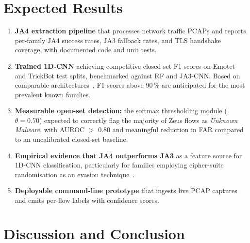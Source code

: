 \documentclass[12pt,a4paper]{report}
\begin{document}
\chapter{Expected Results}

\begin{enumerate}[leftmargin=*, label=\arabic*.]
  \item \textbf{JA4 extraction pipeline} that processes network traffic PCAPs and
  reports per-family JA4 success rates, JA3 fallback rates, and TLS handshake
  coverage, with documented code and unit tests.

  \item \textbf{Trained 1D-CNN} achieving competitive closed-set F1-scores on
  Emotet and TrickBot test splits, benchmarked against RF and JA3-CNN. Based on
  comparable architectures~\cite{liu2024encrypted, spd2025}, F1-scores above
  90\,\% are anticipated for the most prevalent known families.

  \item \textbf{Measurable open-set detection:} the softmax thresholding module
  ($\theta = 0.70$) expected to correctly flag the majority of Zeus flows as
  \textit{Unknown Malware}, with AUROC $>$ 0.80 and meaningful reduction in FAR
  compared to an uncalibrated closed-set baseline.

  \item \textbf{Empirical evidence that JA4 outperforms JA3} as a feature source
  for 1D-CNN classification, particularly for families employing cipher-suite
  randomisation as an evasion technique~\cite{althouse2023ja4}.

  \item \textbf{Deployable command-line prototype} that ingests live PCAP captures
  and emits per-flow labels with confidence scores.
\end{enumerate}

\chapter{Discussion and Conclusion}
\end{document}
